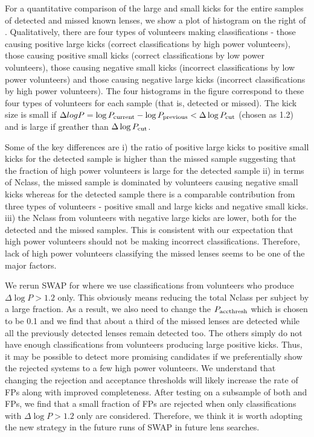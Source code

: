 \documentclass[useAMS,usenatbib,a4paper]{mn2e}
\begin{document}
For a quantitative comparison of the large and small kicks for the
entire samples of detected and missed known lenses, we show a plot of
histogram on the right of . Qualitatively, there are
four types of volunteers making classifications - those causing positive
large kicks (correct classifications by high power volunteers), those
causing positive small kicks (correct classifications by low power
volunteers), those causing negative small kicks (incorrect
classifications by low power volunteers) and those causing negative
large kicks (incorrect classifications by high power volunteers). The
four histograms in the figure correspond to these four types of
volunteers for each sample (that is, detected or missed). The kick size
is small if $\Delta log{P} = \log{P_{\rm current}} - \log{P_{\rm
previous}} < \Delta\log{P}_{\rm cut}$ (chosen as 1.2) and is large
if greather than $\Delta\log{P}_{\rm cut}$.

Some of the key differences are i) the ratio of positive large kicks to
positive small kicks for the detected sample is higher than the missed
sample suggesting that the fraction of high power volunteers is large
for the detected sample ii) in terms of Nclass, the missed sample is
dominated by volunteers causing negative small kicks whereas for the
detected sample there is a comparable contribution from three types of
volunteers - positive small and large kicks and negative small kicks.
iii) the Nclass from volunteers with negative large kicks are lower, both
for the detected and the missed samples. This is consistent with our
expectation that high power volunteers should not be making incorrect
classifications. Therefore, lack of high power volunteers classifying
the missed lenses seems to be one of the major factors.

We rerun SWAP for \StageOne where we use classifications from volunteers
who produce $\Delta \log{P} > 1.2$ only. This obviously means reducing
the total Nclass per subject by a large fraction. As a result, we also
need to change the $P_{\rm acc thresh}$ which is chosen to be 0.1 and we
find that about a third of the missed lenses are detected while all the
previously detected lenses remain detected too. The others simply do not
have enough classifications from volunteers producing large positive
kicks. Thus, it may be possible to detect more promising candidates if
we preferentially show the rejected systems to a few high power
volunteers. We understand that changing the rejection and acceptance
thresholds will likely increase the rate of FPs along with improved
completeness. After testing on a subsample of both \StageOne and
\StageTwo FPs, we find that a small fraction of FPs are rejected when
only classifications with $\Delta \log{P}>1.2$ only are considered.
Therefore, we think it is worth adopting the new strategy in the future
runs of SWAP in future lens searches.
\end{document}
